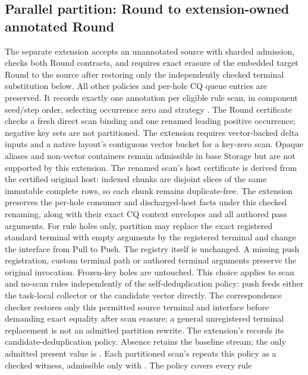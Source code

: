 \subsection{Parallel partition: Round to extension-owned annotated Round}
The separate extension accepts an unannotated source with sharded admission,
checks both Round contracts, and requires exact erasure of the embedded target
Round to the source after restoring only the independently checked terminal
substitution below. All other policies and per-hole CQ queue entries are preserved.
It records
exactly one annotation per eligible rule scan, in component seed/step order,
selecting occurrence zero and strategy . The Round
certificate checks a fresh direct scan binding and one renamed leading
positive occurrence; negative key sets are not partitioned.
The extension requires vector-backed delta inputs and a native layout's
contiguous vector bucket for a key-zero scan. Opaque aliases and non-vector
containers remain admissible in base Storage but are not supported by this
extension.
The renamed scan's host certificate is derived from the certified original
host: indexed chunks are disjoint slices of the same immutable complete rows,
so each chunk remains duplicate-free. The extension preserves the per-hole
consumer and discharged-host facts under this checked renaming, along with
their exact CQ context envelopes and all authored pass arguments.
For rule holes only, partition may replace the exact registered standard
 terminal with empty arguments by
the registered  terminal and change
the interface from Pull to Push. The registry itself is unchanged. A missing
push registration, custom terminal path or authored terminal arguments preserve
the original invocation. Frozen-key holes are untouched. This choice applies
to scan and no-scan rules independently of the self-deduplication policy:
push feeds either the task-local collector or the candidate vector directly.
The correspondence checker restores only this permitted source terminal and
interface before demanding exact equality after scan erasure; a general
unregistered terminal replacement is not an admitted partition rewrite.
The extension's  records
its candidate-deduplication policy. Absence retains the baseline stream;
the only admitted present value is . Each partitioned scan's
 repeats this policy as a checked witness,
admissible only with . The policy covers every rule
